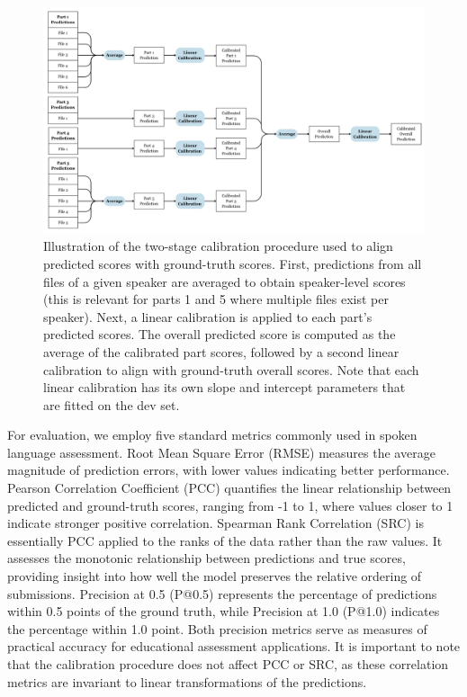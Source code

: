 \documentclass{report}
\begin{document}
\begin{figure}[h]
  \centering
  \includegraphics[width=1\linewidth]{images/calibration_schematic.png}
  \caption{Illustration of the two-stage calibration procedure used to align predicted scores with ground-truth scores. First, predictions from all files of a given speaker are averaged to obtain speaker-level scores (this is relevant for parts 1 and 5 where multiple files exist per speaker). Next, a linear calibration is applied to each part's predicted scores. The overall predicted score is computed as the average of the calibrated part scores, followed by a second linear calibration to align with ground-truth overall scores. Note that each linear calibration has its own slope and intercept parameters that are fitted on the dev set.}
  \label{fig:calibration_procedure}
\end{figure}

For evaluation, we employ five standard metrics commonly used in spoken language assessment. Root Mean Square Error (RMSE) measures the average magnitude of prediction errors, with lower values indicating better performance. Pearson Correlation Coefficient (PCC) quantifies the linear relationship between predicted and ground-truth scores, ranging from -1 to 1, where values closer to 1 indicate stronger positive correlation. Spearman Rank Correlation (SRC) is essentially PCC applied to the ranks of the data rather than the raw values. It assesses the monotonic relationship between predictions and true scores, providing insight into how well the model preserves the relative ordering of submissions. Precision at 0.5 (P@0.5) represents the percentage of predictions within 0.5 points of the ground truth, while Precision at 1.0 (P@1.0) indicates the percentage within 1.0 point. Both precision metrics serve as measures of practical accuracy for educational assessment applications. It is important to note that the calibration procedure does not affect PCC or SRC, as these correlation metrics are invariant to linear transformations of the predictions.
\end{document}
